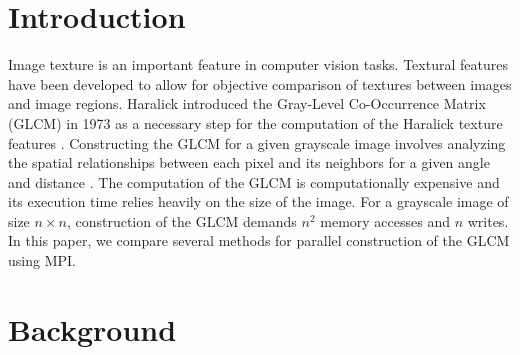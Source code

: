 \documentclass{article}
\begin{document}


\begin{abstract}

\end{abstract}

\section{Introduction}
    Image texture is an important feature in computer vision tasks. Textural features have been developed to allow for objective comparison of textures between images and image regions. Haralick introduced the Gray-Level Co-Occurrence Matrix (GLCM) in 1973 as a necessary step for the computation of the Haralick texture features \cite{haralick}. Constructing the GLCM for a given grayscale image involves analyzing the spatial relationships between each pixel and its neighbors for a given angle and distance \cite{haralick}. The computation of the GLCM is computationally expensive and its execution time relies heavily on the size of the image. For a grayscale image of size $n \times n$, construction of the GLCM demands $n^2$ memory accesses and $n$ writes. In this paper, we compare several methods for parallel construction of the GLCM using MPI. 
\section{Background}
\end{document}
